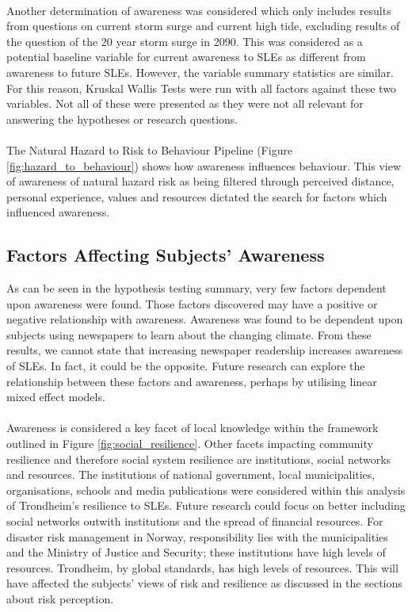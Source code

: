 \paragraph{}
Another determination of awareness was considered which only includes results from questions on current storm surge and current high tide, excluding results of the question of the 20 year storm surge in 2090. This was considered as a potential baseline variable for current awareness to SLEs as different from awareness to future SLEs. However, the variable summary statistics are similar. For this reason, Kruskal Wallis Tests were run with all factors against these two variables. Not all of these were presented as they were not all relevant for answering the hypotheses or research questions. 

\paragraph{}
The Natural Hazard to Risk to Behaviour Pipeline (Figure \ref{fig:hazard_to_behaviour}) shows how awareness influences behaviour. This view of awareness of natural hazard risk as being filtered through perceived distance, personal experience, values and resources dictated the search for factors which influenced awareness. 



\subsection{Factors Affecting Subjects' Awareness}
As can be seen in the hypothesis testing summary, very few factors dependent upon awareness were found. Those factors discovered may have a positive or negative relationship with awareness. Awareness was found to be dependent upon subjects using newspapers to learn about the changing climate. From these results, we cannot state that increasing newspaper readership increases awareness of SLEs. In fact, it could be the opposite. Future research can explore the relationship between these factors and awareness, perhaps by utilising linear mixed effect models.
\paragraph{}
Awareness is considered a key facet of local knowledge within the framework outlined in Figure \ref{fig:social_resilience}. Other facets impacting community resilience and therefore social system resilience are institutions, social networks and resources. The institutions of national government, local municipalities, organisations, schools and media publications were considered within this analysis of Trondheim's resilience to SLEs. Future research could focus on better including social networks outwith institutions and the spread of financial resources. For disaster risk management in Norway, responsibility lies with the municipalities and the Ministry of Justice and Security; these institutions have high levels of resources. Trondheim, by global standards, has high levels of resources. This will have affected the subjects' views of risk and resilience as discussed in the sections about risk perception. 

